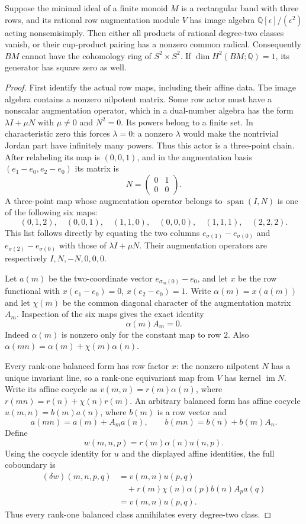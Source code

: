 \begin{proposition}\label{B:three-row-dual-cup-radical}
Suppose the minimal ideal of a finite monoid $M$ is a rectangular
band with three rows, and its rational row augmentation module
$V$ has image algebra $\mathbb Q[\epsilon]/(\epsilon^2)$ acting
nonsemisimply.  Then either all products of rational degree-two
classes vanish, or their cup-product pairing has a nonzero common
radical.  Consequently $BM$ cannot have the cohomology ring of
$S^2\times S^2$.  If $\dim H^2(BM;\mathbb Q)=1$, its generator
has square zero as well.
\end{proposition}
\begin{proof}
First identify the actual row maps, including their affine data.
The image algebra contains a nonzero nilpotent matrix.  Some row
actor must have a nonscalar augmentation operator, which in a
dual-number algebra has the form $\lambda I+\mu N$ with
$\mu\ne0$ and $N^2=0$.  Its powers belong to a finite set.
In characteristic zero this forces $\lambda=0$: a nonzero
$\lambda$ would make the nontrivial Jordan part have infinitely
many powers.  Thus this actor is a three-point chain.  After
relabeling its map is $(0,0,1)$, and in the augmentation basis
$(e_1-e_0,e_2-e_0)$ its matrix is
\[
 N=\begin{pmatrix}0&1\\0&0\end{pmatrix}.
\]
A three-point map whose augmentation operator belongs to
$\operatorname{span}(I,N)$ is one of the following six maps:
\[
 (0,1,2),\quad (0,0,1),\quad(1,1,0),\quad
 (0,0,0),\quad(1,1,1),\quad(2,2,2).
\]
This list follows directly by equating the two columns
$e_{\sigma(1)}-e_{\sigma(0)}$ and
$e_{\sigma(2)}-e_{\sigma(0)}$ with those of $\lambda I+\mu N$.
Their augmentation operators are respectively $I,N,-N,0,0,0$.

Let $a(m)$ be the two-coordinate vector
$e_{\sigma_m(0)}-e_0$, and let $x$ be the row functional with
$x(e_1-e_0)=0$, $x(e_2-e_0)=1$.  Write
$\alpha(m)=x(a(m))$ and let $\chi(m)$ be the common diagonal
character of the augmentation matrix $A_m$.
Inspection of the six maps gives the exact identity
\[
 \alpha(m)A_m=0.
\]
Indeed $\alpha(m)$ is nonzero only for the constant map to row
$2$.  Also
$\alpha(mn)=\alpha(m)+\chi(m)\alpha(n)$.

Every rank-one balanced form has row factor $x$: the nonzero
nilpotent $N$ has a unique invariant line, so a rank-one
equivariant map from $V$ has kernel $\operatorname{im}N$.
Write its affine cocycle as
$v(m,n)=r(m)\alpha(n)$, where
$r(mn)=r(n)+\chi(n)r(m)$.
An arbitrary balanced form has affine cocycle
$u(m,n)=b(m)a(n)$, where $b(m)$ is a row vector and
\[
 a(mn)=a(m)+A_m a(n),\qquad
 b(mn)=b(n)+b(m)A_n.
\]
Define
\[
 w(m,n,p)=r(m)\alpha(n)u(n,p).
\]
Using the cocycle identity for $u$ and the displayed affine
identities, the full coboundary is
\begin{align*}
 (\delta w)(m,n,p,q)
 &=v(m,n)u(p,q)\\
 &\quad+r(m)\chi(n)\alpha(p)b(n)A_p a(q)\\
 &=v(m,n)u(p,q).
\end{align*}
Thus every rank-one balanced class annihilates every
degree-two class.


\end{proof}
